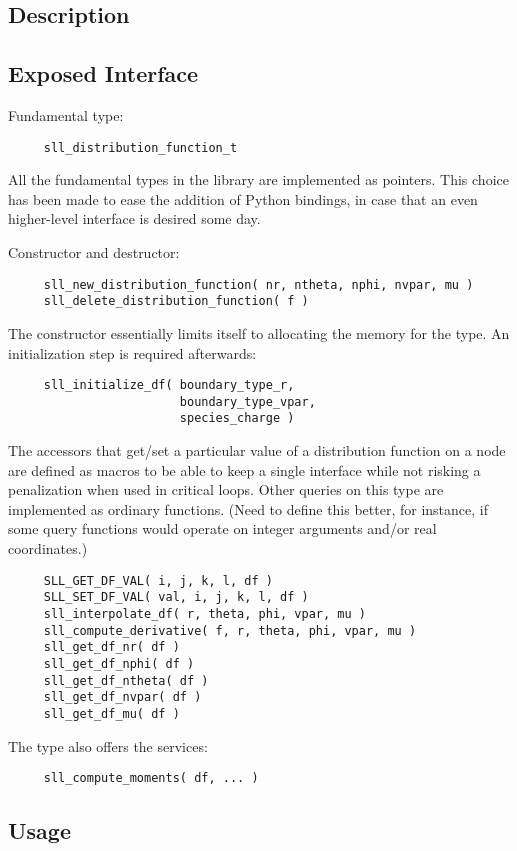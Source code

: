 \documentclass[]{report}   %
\begin{document}
\subsection{Description}
\subsection{Exposed Interface}
Fundamental type:
\begin{verbatim}
     sll_distribution_function_t
\end{verbatim}
All the fundamental types in the library are implemented as pointers. This choice has been made to ease the addition of Python bindings, in case that an even higher-level interface is desired some day.

Constructor and destructor:
\begin{verbatim}
     sll_new_distribution_function( nr, ntheta, nphi, nvpar, mu )
     sll_delete_distribution_function( f )
\end{verbatim}
The constructor essentially limits itself to allocating the memory for the type. An initialization step is required afterwards:
\begin{verbatim}
     sll_initialize_df( boundary_type_r, 
                        boundary_type_vpar, 
                        species_charge )
\end{verbatim}
The accessors that get/set a particular value of a distribution function on a node are defined as macros to be able to keep a single interface while not risking a penalization when used in critical loops. Other queries on this type are implemented as ordinary functions. (Need to define this better, for instance, if some query functions would operate on integer arguments and/or real coordinates.)
\begin{verbatim}
     SLL_GET_DF_VAL( i, j, k, l, df )
     SLL_SET_DF_VAL( val, i, j, k, l, df )
     sll_interpolate_df( r, theta, phi, vpar, mu )
     sll_compute_derivative( f, r, theta, phi, vpar, mu )
     sll_get_df_nr( df )
     sll_get_df_nphi( df )
     sll_get_df_ntheta( df )
     sll_get_df_nvpar( df )
     sll_get_df_mu( df )
\end{verbatim}
The type also offers the services:
\begin{verbatim}
     sll_compute_moments( df, ... )
\end{verbatim}

\subsection{Usage}
\end{document}
